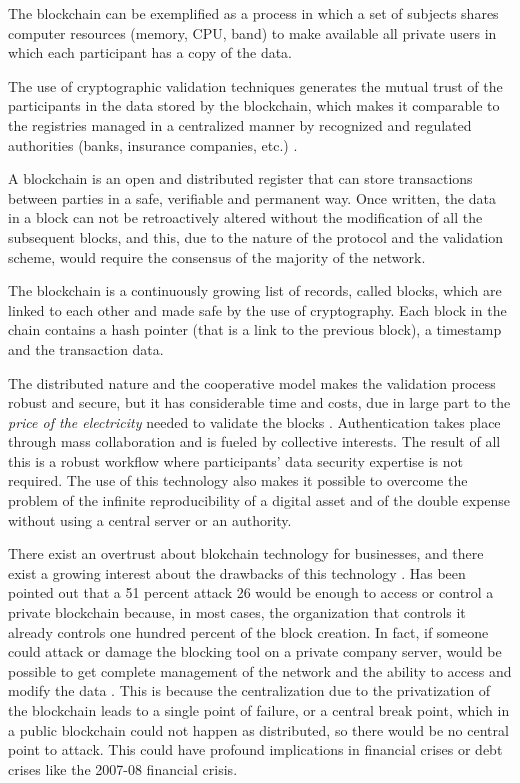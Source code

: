 \documentclass[b5paper,]{book}
\theoremstyle{definition}
\theoremstyle{definition}
\theoremstyle{definition}
\theoremstyle{remark}
\begin{document}
The blockchain can be exemplified as a process in which a set of
subjects shares computer resources (memory, CPU, band) to make available
all private users in which each participant has a copy of the data.

The use of cryptographic validation techniques generates the mutual
trust of the participants in the data stored by the blockchain, which
makes it comparable to the registries managed in a centralized manner by
recognized and regulated authorities (banks, insurance companies, etc.)
\citep{pilkington201611}.

A blockchain is an open and distributed register that can store
transactions between parties in a safe, verifiable and permanent way.
Once written, the data in a block can not be retroactively altered
without the modification of all the subsequent blocks, and this, due to
the nature of the protocol and the validation scheme, would require the
consensus of the majority of the network. \citep{iansiti2017truth}

The blockchain is a continuously growing list of records, called blocks,
which are linked to each other and made safe by the use of cryptography.
Each block in the chain contains a hash pointer (that is a link to the
previous block), a timestamp and the transaction data.

The distributed nature and the cooperative model makes the validation
process robust and secure, but it has considerable time and costs, due
in large part to the \emph{price of the electricity} needed to validate
the blocks \citep{underwood2016blockchain}. Authentication takes place
through mass collaboration and is fueled by collective interests. The
result of all this is a robust workflow where participants' data
security expertise is not required. The use of this technology also
makes it possible to overcome the problem of the infinite
reproducibility of a digital asset and of the double expense without
using a central server or an authority. \citep{karame2012double}

There exist an overtrust about blokchain technology for businesses, and
there exist a growing interest about the drawbacks of this technology
\citep{eyal2018majority, lin2017survey, yli2016current}. Has been
pointed out that a 51 percent attack 26 would be enough to access or
control a private blockchain because, in most cases, the organization
that controls it already controls one hundred percent of the block
creation. In fact, if someone could attack or damage the blocking tool
on a private company server, would be possible to get complete
management of the network and the ability to access and modify the data
\citep{hampton2016understanding}. This is because the centralization due
to the privatization of the blockchain leads to a single point of
failure, or a central break point, which in a public blockchain could
not happen as distributed, so there would be no central point to attack.
This could have profound implications in financial crises or debt crises
like the 2007-08 financial crisis.
\end{document}
